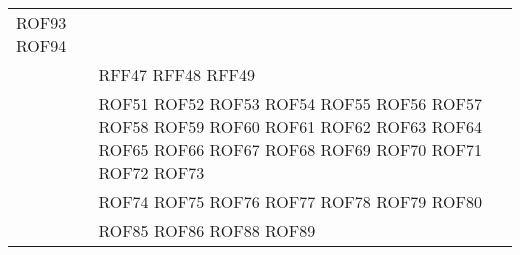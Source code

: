 \documentclass[../DefinizioneDiProdotto_v2.0.0.tex]{subfiles}
\begin{document}
\begin{longtable}{p{8.5cm}!{\VRule[1pt]}p{2.5cm}}
	ROF93 \newline
	ROF94 \\
	                                                             &   RFF47 \newline
	RFF48 \newline
	RFF49 \\
	                                                         & ROF51 \newline
	ROF52 \newline
	ROF53 \newline
	ROF54 \newline
	ROF55 \newline
	ROF56 \newline
	ROF57 \newline
	ROF58 \newline
	ROF59 \newline
	ROF60 \newline
	ROF61 \newline
	ROF62 \newline
	ROF63 \newline
	ROF64 \newline
	ROF65 \newline
	ROF66 \newline
	ROF67 \newline
	ROF68 \newline
	ROF69 \newline
	ROF70 \newline
	ROF71 \newline
	ROF72 \newline
	ROF73 \\
	                                                                 & ROF74 \newline
	ROF75 \newline
	ROF76 \newline
	ROF77 \newline
	ROF78 \newline
	ROF79 \newline
	ROF80 \newline
	 \\
	  		                            & ROF85 \newline
	ROF86 \newline
	ROF88 \newline
	ROF89 \newline

\end{longtable}
\end{document}
